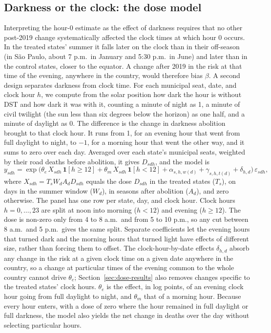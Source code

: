 \subsection{Darkness or the clock: the dose model}\label{sec:dose}

Interpreting the hour-0 estimate as the effect of darkness requires that no other post-2019 change systematically affected the clock times at which hour 0 occurs. In the treated states' summer it falls later on the clock than in their off-season (in S\~ao Paulo, about 7 p.m.\ in January and 5:30 p.m.\ in June) and later than in the control states, closer to the equator. A change after 2019 in the risk at that time of the evening, anywhere in the country, would therefore bias $\beta$. A second design separates darkness from clock time. For each municipal seat, date, and clock hour $h$, we compute from the solar position how dark the hour is without DST and how dark it was with it, counting a minute of night as 1, a minute of civil twilight (the sun less than six degrees below the horizon) as one half, and a minute of daylight as 0. The difference is the change in darkness abolition brought to that clock hour. It runs from 1, for an evening hour that went from full daylight to night, to $-1$, for a morning hour that went the other way, and it sums to zero over each day. Averaged over each state's municipal seats, weighted by their road deaths before abolition, it gives $D_{sdh}$, and the model is
\begin{equation}\label{eq:dose}
  y_{sdh} = \exp\big(\theta_e\, X_{sdh}\, \mathbf{1}[h \ge 12] + \theta_m\, X_{sdh}\, \mathbf{1}[h < 12] + \alpha_{s,h,w(d)} + \gamma_{s,h,t(d)} + \delta_{h,d}\big)\,\varepsilon_{sdh},
\end{equation}
where $X_{sdh} = T_s W_d A_d D_{sdh}$ equals the dose $D_{sdh}$ in the treated states ($T_s$), on days in the summer window ($W_d$), in seasons after abolition ($A_d$), and zero otherwise. The panel has one row per state, day, and clock hour. Clock hours $h = 0, \dots, 23$ are split at noon into morning ($h < 12$) and evening ($h \ge 12$). The dose is non-zero only from 4 to 8 a.m.\ and from 5 to 10 p.m., so any cut between 8 a.m.\ and 5 p.m.\ gives the same split. Separate coefficients let the evening hours that turned dark and the morning hours that turned light have effects of different size, rather than forcing them to offset. %
The clock-hour-by-date effects $\delta_{h,d}$ absorb any change in the risk at a given clock time on a given date anywhere in the country, so a change at particular times of the evening common to the whole country cannot drive $\theta_e$; Section~\ref{sec:dose-results} also removes changes specific to the treated states' clock hours. $\theta_e$ is the effect, in log points, of an evening clock hour going from full daylight to night, and $\theta_m$ that of a morning hour. Because every hour enters, with a dose of zero where the hour remained in full daylight or full darkness, the model also yields the net change in deaths over the day without selecting particular hours.

